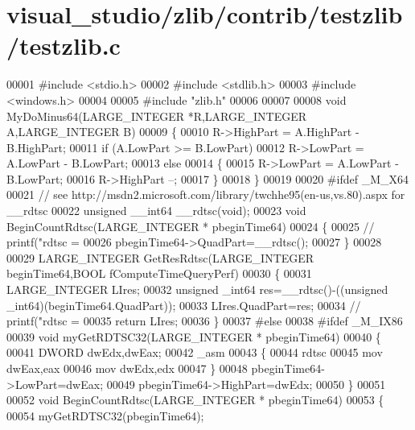 \hypertarget{visual__studio_2zlib_2contrib_2testzlib_2testzlib_8c_source}{}\section{visual\+\_\+studio/zlib/contrib/testzlib/testzlib.c}
\label{visual__studio_2zlib_2contrib_2testzlib_2testzlib_8c_source}

\begin{DoxyCode}
00001 \textcolor{preprocessor}{#include <stdio.h>}
00002 \textcolor{preprocessor}{#include <stdlib.h>}
00003 \textcolor{preprocessor}{#include <windows.h>}
00004 
00005 \textcolor{preprocessor}{#include "zlib.h"}
00006 
00007 
00008 \textcolor{keywordtype}{void} MyDoMinus64(LARGE\_INTEGER *R,LARGE\_INTEGER A,LARGE\_INTEGER B)
00009 \{
00010     R->HighPart = A.HighPart - B.HighPart;
00011     \textcolor{keywordflow}{if} (A.LowPart >= B.LowPart)
00012         R->LowPart = A.LowPart - B.LowPart;
00013     \textcolor{keywordflow}{else}
00014     \{
00015         R->LowPart = A.LowPart - B.LowPart;
00016         R->HighPart --;
00017     \}
00018 \}
00019 
00020 \textcolor{preprocessor}{#ifdef \_M\_X64}
00021 \textcolor{comment}{// see http://msdn2.microsoft.com/library/twchhe95(en-us,vs.80).aspx for \_\_rdtsc}
00022 \textcolor{keywordtype}{unsigned} \_\_int64 \_\_rdtsc(\textcolor{keywordtype}{void});
00023 \textcolor{keywordtype}{void} BeginCountRdtsc(LARGE\_INTEGER * pbeginTime64)
00024 \{
00025  \textcolor{comment}{//   printf("rdtsc = %
00026    pbeginTime64->QuadPart=\_\_rdtsc();
00027 \}
00028 
00029 LARGE\_INTEGER GetResRdtsc(LARGE\_INTEGER beginTime64,BOOL fComputeTimeQueryPerf)
00030 \{
00031     LARGE\_INTEGER LIres;
00032     \textcolor{keywordtype}{unsigned} \_int64 res=\_\_rdtsc()-((\textcolor{keywordtype}{unsigned} \_int64)(beginTime64.QuadPart));
00033     LIres.QuadPart=res;
00034    \textcolor{comment}{// printf("rdtsc = %
00035     \textcolor{keywordflow}{return} LIres;
00036 \}
00037 \textcolor{preprocessor}{#else}
00038 \textcolor{preprocessor}{#ifdef \_M\_IX86}
00039 \textcolor{keywordtype}{void} myGetRDTSC32(LARGE\_INTEGER * pbeginTime64)
00040 \{
00041     DWORD dwEdx,dwEax;
00042     \_asm
00043     \{
00044         rdtsc
00045         mov dwEax,eax
00046         mov dwEdx,edx
00047     \}
00048     pbeginTime64->LowPart=dwEax;
00049     pbeginTime64->HighPart=dwEdx;
00050 \}
00051 
00052 \textcolor{keywordtype}{void} BeginCountRdtsc(LARGE\_INTEGER * pbeginTime64)
00053 \{
00054     myGetRDTSC32(pbeginTime64);
}}
\end{DoxyCode}
